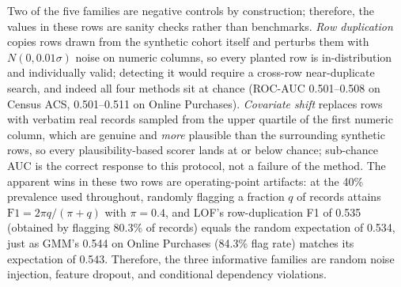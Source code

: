 \documentclass[pdflatex,sn-mathphys-num]{sn-jnl}
\theoremstyle{thmstyleone}%
\theoremstyle{thmstyletwo}%
\theoremstyle{thmstylethree}%
\begin{document}
Two of the five families are negative controls by construction; therefore, the values in these rows are sanity checks rather than benchmarks. \textit{Row duplication} copies rows drawn from the synthetic cohort itself and perturbs them with $N(0, 0.01\sigma)$ noise on numeric columns, so every planted row is in-distribution and individually valid; detecting it would require a cross-row near-duplicate search, and indeed all four methods sit at chance (ROC-AUC 0.501--0.508 on Census ACS, 0.501--0.511 on Online Purchases). \textit{Covariate shift} replaces rows with verbatim real records sampled from the upper quartile of the first numeric column, which are genuine and \emph{more} plausible than the surrounding synthetic rows, so every plausibility-based scorer lands at or below chance; sub-chance AUC is the correct response to this protocol, not a failure of the method. The apparent wins in these two rows are operating-point artifacts: at the 40\% prevalence used throughout, randomly flagging a fraction $q$ of records attains $\mathrm{F1} = 2\pi q/(\pi + q)$ with $\pi = 0.4$, and LOF's row-duplication F1 of 0.535 (obtained by flagging 80.3\% of records) equals the random expectation of 0.534, just as GMM's 0.544 on Online Purchases (84.3\% flag rate) matches its expectation of 0.543. Therefore, the three informative families are random noise injection, feature dropout, and conditional dependency violations.
\end{document}
